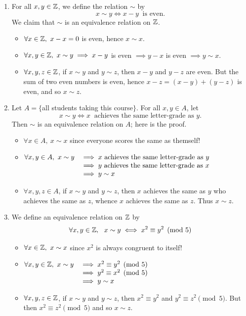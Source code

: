 \begin{examples}{}{}
\begin{enumerate}
	\item For all $x,y\in\mathbb{Z}$, we define the relation $\sim$ by
	\[
		x\sim y\iff x-y\ \text{ is even.}
	\]
	We claim that $\sim$ is an equivalence relation on $\mathbb{Z}$.
	\begin{itemize}
		\item {} $\forall x\in\mathbb{Z},\ x-x=0$ is even, hence $x\sim x$.
		\item \symm $\forall x,y\in\mathbb{Z},\ x\sim y\implies x-y$ is even $\implies y-x$ is even $\implies y\sim x$.
		\item \trans$\forall x,y,z\in\mathbb{Z}$, if $x\sim y$ and $y\sim z$, then $x-y$ and $y-z$ are even. But the sum of two even numbers is even, hence $x-z=(x-y)+(y-z)$ is even, and so $x\sim z$.
	\end{itemize}
	
	\item Let $A=\{$all students taking this course$\}$. For all $x,y\in A$, let
	\[x\sim y\iff x\ \text{ achieves the same letter-grade as $y$.}\]
	Then $\sim$ is an equivalence relation on $A$; here is the proof.
	\begin{itemize}
		\item {} $\forall x\in A,\ x\sim x$ since everyone scores the same as themself!
		\item \symm $\begin{array}[t]{@{}rl}
			\forall x,y\in A,\ x\sim y&\implies x\ \text{achieves the same letter-grade as $y$}\\
			&\implies y\ \text{achieves the same letter-grade as $x$}\\
			&\implies y\sim x
		\end{array}$
		\item \trans$\forall x,y,z\in A$, if $x\sim y$ and $y\sim z$, then $x$ achieves the same as $y$ who achieves the same as $z$, whence $x$ achieves the same as $z$. Thus $x\sim z$.
	\end{itemize}

	\item We define an equivalence relation on $\mathbb{Z}$ by
	\[
		\forall x,y\in\mathbb{Z},\ \ x\sim y\iff x^2\equiv y^2\pmod 5
	\]
		\begin{itemize}
			\item {} $\forall x\in\mathbb{Z},\ x\sim x$ since $x^2$ is always congruent to itself!
			\item \symm $\begin{array}[t]{@{}rl}
				\forall x,y\in\Z,\ x\sim y&\implies x^2\equiv y^2\pmod 5\\
				&\implies y^2\equiv x^2\pmod 5\\
				&\implies y\sim x
			\end{array}$
			\item \trans $\forall x,y,z\in\mathbb{Z}$, if $x\sim y$ and $y\sim z$, then $x^2\equiv y^2$ and $y^2\equiv z^2\pmod 5$. But then $x^2\equiv z^2\pmod 5$ and so $x\sim z$.
	\end{itemize}
\end{enumerate}
\end{examples}

